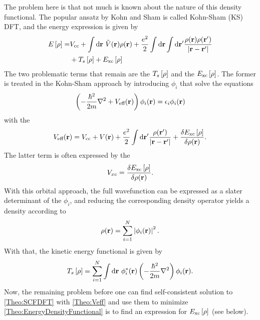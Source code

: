 \documentclass[8.5pt,twoside,twocolumn]{article}
\newcommand\di{\te{d}}
\renewcommand\r{\bo r}
\newcommand\indr{\enmat{\int\di \r}}
\theoremstyle{standard}
\begin{document}
The problem here is that not much is known about the nature of this density functional. The
popular ansatz by Kohn and Sham \cite{KohnSham} is called Kohn-Sham (KS) DFT, and the energy
expression is given by
\newcommand\er{\ed{\rho}}
\newcommand\exc{E_{\te{xc}}}
\begin{equation}
\begin{aligned}
 E\ed{\rho}=&\vcc+\indr\ \tilde V(\r) \rho(\r) + \frac {e^2}{2}\indr\indr' \frac {\rho(\r)\rho(\r')}{\abs{\r-\r'}}\\
 &+T_s 	\ed{\rho}+\exc\ed{\rho}
\end{aligned}
\label{Theo:EnergyDensityFunctional}
\end{equation}
The two problematic terms that remain are the  $T_s\er$ and the
 $\exc\er$. The former is treated in the Kohn-Sham approach
by  introducing  $\phi_i$ that solve the equations
\newcommand\veff{V_{\te{eff}}}
\newcommand\hm{\frac{\hbar^2}{2m}}
\begin{equation}
\rb{-\frac{\hbar^2}{2m} \nabla^2 + \veff(\r)} \phi_i(\r) = \eps_i \phi_i(\r)
\label{Theo:SCFDFT}
\end{equation}
with the 
\begin{equation}
\veff(\r)=\vcc+V(\r) + \frac {e^2}2 \indr' \frac{\rho(\r')}{\abs{\r-\r'}}+\delti{\exc\er}{\rho(\r)}.
\label{Theo:Veff}
\end{equation}
The latter term is often expressed by the 
\newcommand\vxc{V_{xc}}
\begin{equation}
\vxc=\delti{\exc\er}{\rho(\r)}.
\label{Theo:Vxc}
\end{equation}
With this orbital approach, the full wavefunction can be expressed as a slater determinant of 
the $\phi_i$, and reducing the corresponding density operator yields a density according to
\begin{equation}
\rho(\r)=\sum_{i=1}^N \abs{\phi_i(\r)}^2.
\label{Theo:RhoByPhi}
\end{equation}
With that, the kinetic energy functional is given by
\begin{equation}
T_s\er=\sum_{i=1}^N \indr\ \phi_i^*(\r) \rb{-\hm \nabla^2} \phi_i(\r).
\end{equation}
Now, the remaining problem before one can find self-consistent solution to \eqref{Theo:SCFDFT}
with \eqref{Theo:Veff} and use them to minimize \eqref{Theo:EnergyDensityFunctional} is to
find an expression for $\exc\er$ (see below).
\end{document}
